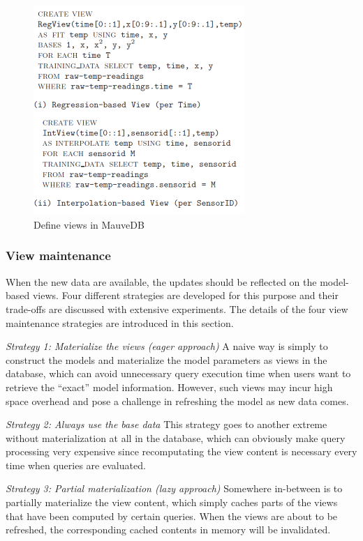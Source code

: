 \begin{figure}
    \centering
    \includegraphics[width=8cm, height=8cm]{Figures/MauveDB_create_view.png}
    \caption{Define views in MauveDB}
    \label{fig:MauveDB_view_def}
\end{figure}

\subsubsection{View maintenance}
When the new data are available, the updates should be reflected on the model-based views. Four different strategies are developed for this purpose and their trade-offs are discussed with extensive experiments. The details of the four view maintenance strategies are introduced in this section.

\textit{Strategy 1: Materialize the views (eager approach)}
A naive way is simply to construct the models and materialize the model parameters as views in the database, which can avoid unnecessary query execution time when users want to retrieve the ``exact'' model information. However, such views may incur high space overhead and pose a challenge in refreshing the model as new data comes.

\textit{Strategy 2: Always use the base data }
This strategy goes to another extreme without materialization at all in the database, which can obviously make query processing very expensive since recomputating the view content is necessary every time when queries are evaluated. 

\textit{Strategy 3: Partial materialization (lazy approach)}
Somewhere in-between is to partially materialize the view content, which simply caches parts of the views that have been computed by certain queries. When the views are about to be refreshed, the corresponding cached contents in memory will be invalidated.

